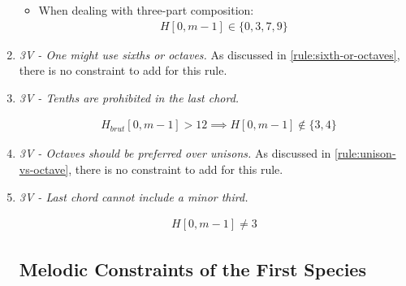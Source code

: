 \begin{enumerate}[wide, label=\bfseries 1.H\arabic*]
\begin{itemize}
\item When dealing with three-part composition:\begin{equation}
    \begin{aligned}
        H[0, m-1] \in \{0, 3, 7, 9\}
    \end{aligned}
\end{equation}
\end{itemize}

\item  \textit{3V - One might use sixths or octaves.}
As discussed in \ref{rule:sixth-or-octaves}, there is no constraint to add for this rule.

\item \textit{3V - Tenths are prohibited in the last chord.}

\begin{equation} \begin{aligned}
&H_{brut}[0, m-1] > 12 \implies H[0, m-1] \notin \{3, 4\}
\end{aligned} \end{equation}

\item \textit{3V - Octaves should be preferred over unisons.}
As discussed in \ref{rule:unison-vs-octave}, there is no constraint to add for this rule.

\item \textit{3V - Last chord cannot include a minor third.}

\begin{equation} \begin{aligned}
H[0, m-1] \neq 3
\end{aligned} \end{equation}

\subsection*{Melodic Constraints of the First Species}
\end{enumerate}

